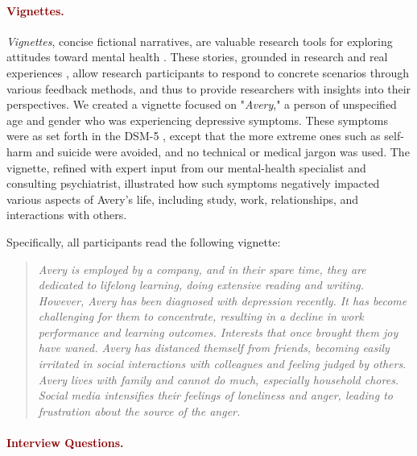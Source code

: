 \paragraph{\textcolor{darkred}{\textbf{Vignettes.}}}

\textit{Vignettes}, concise fictional narratives, are valuable research tools for exploring attitudes toward mental health \cite{vignette_alem_1999}. 
These stories, grounded in research and real experiences \cite{chatbot_aq27_practice_lee_2023, vignette_alem_1999}, allow research participants to respond to concrete scenarios through various feedback methods, and thus to provide researchers with insights into their perspectives. 
We created a vignette focused on "\textit{Avery}," a person of unspecified age and gender who was experiencing depressive symptoms. 
These symptoms were as set forth in the DSM-5 \cite{dsm5_apa_2013}, except that the more extreme ones such as self-harm and suicide were avoided, and no technical or medical jargon was used. 
The vignette, refined with expert input from our mental-health specialist and consulting psychiatrist, illustrated how such symptoms negatively impacted various aspects of Avery's life, including study, work, relationships, and interactions with others.

Specifically, all participants read the following vignette:

\begin{quote}
    \textit{Avery is employed by a company, and in their spare time, they are dedicated to lifelong learning, doing extensive reading and writing. However, Avery has been diagnosed with depression recently. It has become challenging for them to concentrate, resulting in a decline in work performance and learning outcomes. Interests that once brought them joy have waned. Avery has distanced themself from friends, becoming easily irritated in social interactions with colleagues and feeling judged by others. Avery lives with family and cannot do much, especially household chores. Social media intensifies their feelings of loneliness and anger, leading to frustration about the source of the anger.}
\end{quote}



\paragraph{\textcolor{darkred}{\textbf{Interview Questions.}}}

